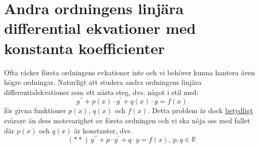 \chapter{Andra ordningens linjära differential ekvationer med konstanta koefficienter}
Ofta räcker första ordningens evkationer inte och vi behöver kunna hantera även högre ordningar.
Naturligt att studera andra ordningens linjära differentialekvationer som ett nästa steg,
dvs. något i stil med:
\begin{equation*}
    y^{\prime\prime}+p(x)\cdot y^\prime+q(x)\cdot y=f(x)
\end{equation*}
för givna funktioner $p(x)$, $q(x)$ och $f(x)$.
Detta problem är dock \underline{betydligt} svårare än dess motsvarighet av första ordningen och vi ska nöja oss med fallet där $p(x)$ och $q(x)$ är konstanter,
dvs.
\begin{equation*}
    (**)\, y^{\prime\prime}+p\cdot y^\prime+q\cdot y=f(x),\,p,q\in\mathbb{R}
\end{equation*}
